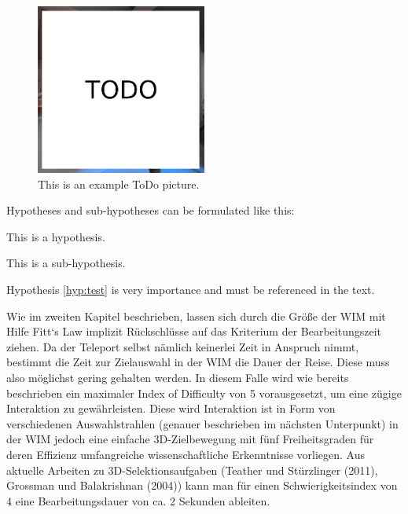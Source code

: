 
\vspace{0.5cm}

\begin{figure}[]
  \centering
  \includegraphics[width=0.5\textwidth]{images/todo.png}
  \caption{This is an example ToDo picture.}
  \label{fig:todo}
\end{figure}

Hypotheses and sub-hypotheses can be formulated like this:

\begin{hypothesis}
\label{hyp:test}
This is a hypothesis.
\end{hypothesis}

\begin{shypothesis}
\label{shyp:test}
This is a sub-hypothesis.
\end{shypothesis}

Hypothesis \cref{hyp:test} is very importance and must be referenced in the text.



Wie im zweiten Kapitel beschrieben, lassen sich durch die Größe der WIM mit Hilfe Fitt`s Law implizit Rückschlüsse auf das Kriterium der Bearbeitungszeit ziehen. Da der Teleport selbst nämlich keinerlei Zeit in Anspruch nimmt, bestimmt die Zeit zur Zielauswahl in der WIM die Dauer der Reise. Diese muss also möglichst gering gehalten werden. In diesem Falle wird wie bereits beschrieben ein maximaler Index of Difficulty von 5 vorausgesetzt, um eine zügige Interaktion zu gewährleisten. Diese wird Interaktion ist in Form von verschiedenen Auswahlstrahlen (genauer beschrieben im nächsten Unterpunkt) in der WIM jedoch eine einfache 3D-Zielbewegung mit fünf Freiheitsgraden für deren Effizienz umfangreiche wissenschaftliche Erkenntnisse vorliegen. Aus aktuelle Arbeiten zu 3D-Selektionsaufgaben (Teather und Stürzlinger (2011), Grossman und Balakrishnan (2004)) kann man für einen Schwierigkeitsindex von 4 eine Bearbeitungsdauer von ca. 2 Sekunden ableiten.




